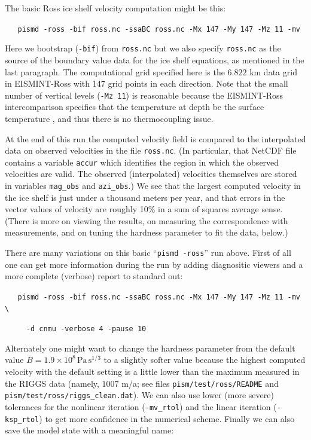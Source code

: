 \documentclass[11pt,final]{amsart}
\begin{document}
The basic Ross ice shelf velocity computation might be this:

\verb|   pismd -ross -bif ross.nc -ssaBC ross.nc -Mx 147 -My 147 -Mz 11 -mv|

\noindent Here we bootstrap (\verb|-bif|) from \verb|ross.nc| but we also specify \verb|ross.nc| as the source of the boundary value data for the ice shelf equations, as mentioned in the last paragraph.  The computational grid specified here is the $6.822$ km data grid in EISMINT-Ross with 147 grid points in each direction.  Note that the small number of vertical levels (\verb|-Mz 11|) is reasonable because the EISMINT-Ross intercomparison specifies that the temperature at depth be the surface temperature \cite{MacAyealetal}, and thus there is no thermocoupling issue.

At the end of this run the computed velocity field is compared to the interpolated data on observed velocities in the file \verb|ross.nc|.  (In particular, that NetCDF file contains a variable \verb|accur| which identifies the region in which the observed velocities are valid.  The observed (interpolated) velocities themselves are stored in variables \verb|mag_obs| and \verb|azi_obs|.)  We see that the largest computed velocity in the ice shelf is just under a thousand meters per year, and that errors in the vector values of velocity are roughly 10\% in a sum of squares average sense.  (There is more on viewing the results, on measuring the correspondence with measurements, and on tuning the hardness parameter to fit the data, below.)

There are many variations on this basic ``\verb|pismd -ross|'' run above.  First of all one can get more information during the run by adding diagnositic viewers and a more complete (verbose) report to standard out:

\verb|   pismd -ross -bif ross.nc -ssaBC ross.nc -Mx 147 -My 147 -Mz 11 -mv \|

\verb|     -d cnmu -verbose 4 -pause 10|

\noindent Alternately one might want to change the hardness parameter from the default value $\bar B = 1.9 \times 10^8 \, \text{Pa}\, \text{s}^{1/3}$ \cite{MacAyealetal} to a slightly softer value because the highest computed velocity with the default setting is a little lower than the maximum measured in the RIGGS data (namely, $1007$ m/a; see files \verb|pism/test/ross/README| and \verb|pism/test/ross/riggs_clean.dat|).   We can also use lower (more severe) tolerances for the nonlinear iteration (\verb|-mv_rtol|) and the linear iteration (\verb|-ksp_rtol|) to get more confidence in the numerical scheme.   Finally we can also save the model state with a meaningful name:
\end{document}
